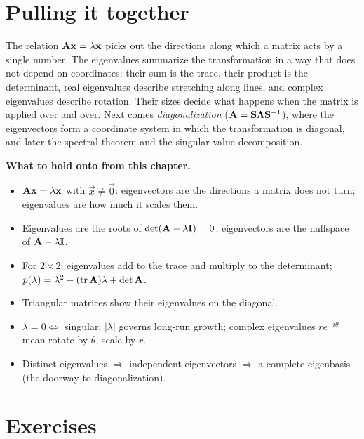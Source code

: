 \section{Pulling it together}
\label{ch23:together}

\begin{aestheticbox}
The relation $\mathbf{A}\mathbf{x}=\lambda\mathbf{x}$ picks out the directions
along which a matrix acts by a single number. The eigenvalues summarize the
transformation in a way that does not depend on coordinates: their sum is the trace,
their product is the determinant, real eigenvalues describe stretching along lines,
and complex eigenvalues describe rotation. Their sizes decide what happens when the
matrix is applied over and over. Next comes \emph{diagonalization}
($\mathbf{A}=\mathbf{S}\mathbf{\Lambda}\mathbf{S}^{-1}$), where the eigenvectors form a coordinate system
in which the transformation is diagonal, and later the spectral theorem and the
singular value decomposition.
\end{aestheticbox}

\begin{focusbox}
\textbf{What to hold onto from this chapter.}
\begin{itemize}
  \item $\mathbf{A}\mathbf{x}=\lambda\mathbf{x}$ with $\vec{x}\neq\vec{0}$: eigenvectors are
        the directions a matrix does not turn; eigenvalues are how much it scales
        them.
  \item Eigenvalues are the roots of $\det(\mathbf{A}-\lambda\mathbf{I})=0$; eigenvectors
        are the nullspace of $\mathbf{A}-\lambda\mathbf{I}$.
  \item For $2\times 2$: eigenvalues add to the trace and multiply to the
        determinant; $p(\lambda)=\lambda^2-(\operatorname{tr}\mathbf{A})\lambda+\det\mathbf{A}$.
  \item Triangular matrices show their eigenvalues on the diagonal.
  \item $\lambda=0\Leftrightarrow$ singular; $|\lambda|$ governs long-run growth;
        complex eigenvalues $r e^{\pm i\theta}$ mean rotate-by-$\theta$,
        scale-by-$r$.
  \item Distinct eigenvalues $\Rightarrow$ independent eigenvectors $\Rightarrow$
        a complete eigenbasis (the doorway to diagonalization).
  \end{itemize}
\end{focusbox}

\section*{Exercises}

